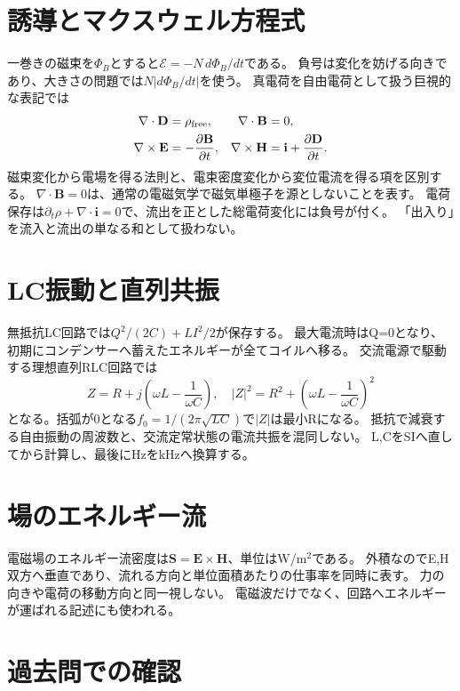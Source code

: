 \section{誘導とマクスウェル方程式}\label{theory:em:induction}\label{theory:em:maxwell}
一巻きの磁束を$\Phi_B$とすると$\mathcal E=-N\,d\Phi_B/dt$である。
負号は変化を妨げる向きであり、大きさの問題では$N|d\Phi_B/dt|$を使う。
真電荷を自由電荷として扱う巨視的な表記では
\begin{align*}
 \nabla\cdot\mathbf D&=\rho_{\rm free},&\nabla\cdot\mathbf B&=0,\\
 \nabla\times\mathbf E&=-\frac{\partial\mathbf B}{\partial t},&
 \nabla\times\mathbf H&=\mathbf i+\frac{\partial\mathbf D}{\partial t}.
\end{align*}
磁束変化から電場を得る法則と、電束密度変化から変位電流を得る項を区別する。
$\nabla\cdot\mathbf B=0$は、通常の電磁気学で磁気単極子を源としないことを表す。
電荷保存は$\partial_t\rho+\nabla\cdot\mathbf i=0$で、流出を正とした総電荷変化には負号が付く。
「出入り」を流入と流出の単なる和として扱わない。\autocite{mit_em10,mit_em13}

\section{LC振動と直列共振}\label{theory:em:lc}\label{theory:em:rlc}
無抵抗LC回路では$Q^2/(2C)+LI^2/2$が保存する。
最大電流時はQ=0となり、初期にコンデンサーへ蓄えたエネルギーが全てコイルへ移る。
交流電源で駆動する理想直列RLC回路では
\[
 Z=R+j\left(\omega L-\frac1{\omega C}\right),\quad
 |Z|^2=R^2+\left(\omega L-\frac1{\omega C}\right)^2
\]
となる。括弧が0となる$f_0=1/(2\pi\sqrt{LC})$で$|Z|$は最小Rになる。
抵抗で減衰する自由振動の周波数と、交流定常状態の電流共振を混同しない。
L,CをSIへ直してから計算し、最後にHzをkHzへ換算する。\autocite{mit_em11,mit_em12}

\section{場のエネルギー流}\label{theory:em:poynting}
電磁場のエネルギー流密度は$\mathbf S=\mathbf E\times\mathbf H$、単位はW/m$^2$である。
外積なのでE,H双方へ垂直であり、流れる方向と単位面積あたりの仕事率を同時に表す。
力の向きや電荷の移動方向と同一視しない。
電磁波だけでなく、回路へエネルギーが運ばれる記述にも使われる。\autocite{mit_em13}


\section{過去問での確認}

